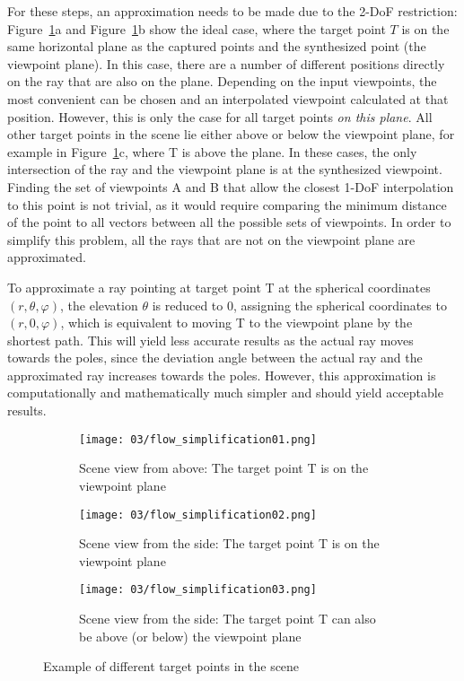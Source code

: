 For these steps, an approximation needs to be made due to the 2-DoF restriction: Figure~\ref{fig:flow_simplification-mot}a and Figure~\ref{fig:flow_simplification-mot}b show the ideal case, where the target point $T$ is on the same horizontal plane as the captured points and the synthesized point (the viewpoint plane). In this case, there are a number of different positions directly on the ray that are also on the plane. Depending on the input viewpoints, the most convenient can be chosen and an interpolated viewpoint calculated at that position. However, this is only the case for all target points \emph{on this plane}. All other target points in the scene lie either above or below the viewpoint plane, for example in Figure~\ref{fig:flow_simplification-mot}c, where T is above the plane. In these cases, the only intersection of the ray and the viewpoint plane is at the synthesized viewpoint. Finding the set of viewpoints A and B that allow the closest 1-DoF interpolation to this point is not trivial, as it would require comparing the minimum distance of the point to all vectors between all the possible sets of viewpoints. In order to simplify this problem, all the rays that are not on the viewpoint plane are approximated.

To approximate a ray pointing at target point T at the spherical coordinates $(r, \theta, \varphi)$, the elevation $\theta$ is reduced to 0, assigning the spherical coordinates to $(r, 0, \varphi)$, which is equivalent to moving T to the viewpoint plane by the shortest path. This will yield less accurate results as the actual ray moves towards the poles, since the deviation angle between the actual ray and the approximated ray increases towards the poles. However, this approximation is computationally and mathematically much simpler and should yield acceptable results.

\begin{figure}
\centering
    \hfill
    \begin{subfigure}[t]{0.3\textwidth}
            \centering
            \texttt{[image: 03/flow\_simplification01.png]}
            \caption{Scene view from above: The target point T is on the viewpoint plane}
    \end{subfigure}%
    \hfill
    \begin{subfigure}[t]{0.3\textwidth}
            \centering
            \texttt{[image: 03/flow\_simplification02.png]}
            \caption{Scene view from the side: The target point T is on the viewpoint plane}
    \end{subfigure}
    \hfill
    \begin{subfigure}[t]{0.3\textwidth}
            \centering
            \texttt{[image: 03/flow\_simplification03.png]}
            \caption{Scene view from the side: The target point T can also be above (or below) the viewpoint plane}
    \end{subfigure}%
    \hfill
    \hfill
  \caption{Example of different target points in the scene} \label{fig:flow_simplification-mot}
\end{figure}


